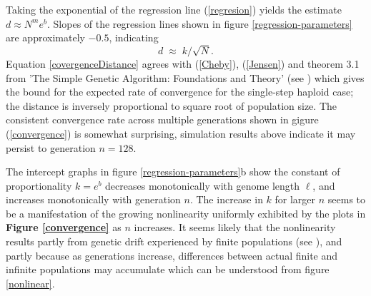 Taking the exponential of the regression line (\ref{regresion}) yields
the estimate
$d \approx N^m e^b $.
Slopes of the regression lines shown in figure \ref{regression-parameters} are
approximately $-0.5$, indicating
\begin{equation}
\label{covergenceDistance}
d \; \approx \; k/\sqrt{N}.
\end{equation} 
Equation \ref{covergenceDistance} agrees with (\ref{Cheby}), (\ref{Jensen}) and 
theorem 3.1 from 'The Simple Genetic Algorithm: Foundations and Theory' (see \cite{Vose1999}) 
which gives the bound for the expected rate of convergence for the single-step haploid case; 
the distance is inversely proportional to square root of population size. 
The consistent convergence rate
across multiple generations shown in gigure (\ref{convergence}) is somewhat surprising, simulation
results above indicate it may persist to generation $n = 128$.

The intercept graphs in figure \ref{regression-parameters}b show the constant of proportionality $k =
e^b$ decreases monotonically with genome length $\ell$, and increases
monotonically with generation $n$.  The increase in $k$ for larger $n$
seems to be a manifestation of the growing nonlinearity uniformly
exhibited by the plots in {\bf Figure \ref{convergence}} as $n$ increases.  It seems
likely that the nonlinearity results partly from genetic drift experienced by
finite populations (see \cite{CrowKimura}), and partly because as generations increase, 
differences between actual finite and infinite populations may accumulate 
which can be understood from figure \ref{nonlinear}. 

